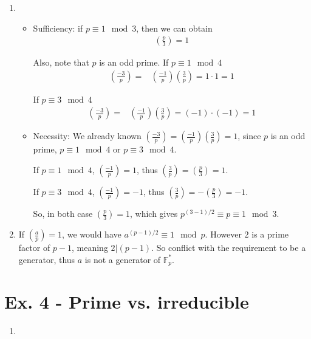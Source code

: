 \documentclass[11pt,a4paper]{article}
\begin{document}
\begin{enumerate}
\item \begin{itemize}
\item Sufficiency: if $p \equiv 1 \mod 3$, then we can obtain
\begin{align*}
	\left(\frac{p}{3}\right) = 1
\end{align*}
\par Also, note that $p$ is an odd prime. If $p \equiv 1 \mod 4$
\begin{align*}
	\left(\frac{-3}{p}\right) =& \left(\frac{-1}{p}\right)\left(\frac{3}{p}\right) = 1 \cdot 1 = 1
\end{align*}
\par If $p \equiv 3 \mod 4$
\begin{align*}
	\left(\frac{-3}{p}\right) =& \left(\frac{-1}{p}\right)\left(\frac{3}{p}\right) = (-1) \cdot (-1) = 1
\end{align*}

\item Necessity: We already known $\left(\frac{-3}{p}\right) = \left(\frac{-1}{p}\right)\left(\frac{3}{p}\right) = 1$, since $p$ is an odd prime, $p \equiv 1 \mod 4$ or $p \equiv 3 \mod 4$.
\par If $p \equiv 1 \mod 4$, $\left(\frac{-1}{p}\right) = 1$, thus $\left(\frac{3}{p}\right) = \left(\frac{p}{3}\right) = 1$.
\par If $p \equiv 3 \mod 4$, $\left(\frac{-1}{p}\right) = -1$, thus $\left(\frac{3}{p}\right) = -\left(\frac{p}{3}\right) = -1$.
\par So, in both case $\left(\frac{p}{3}\right) = 1$, which gives $p^{(3-1)/2} \equiv p \equiv 1 \mod 3$.
\end{itemize}

\item If $\left(\frac{a}{p}\right) = 1$, we would have $a^{(p-1)/2} \equiv 1 \mod p$. However $2$ is a prime factor of $p-1$, meaning $2 \vert (p-1)$. So conflict with the requirement to be a generator, thus $a$ is not a generator of $\mathbb{F}_{p}^{*}$.
\end{enumerate}


\section*{Ex. 4 - Prime vs. irreducible}
\begin{enumerate}
\item 
\end{enumerate}
\end{document}
